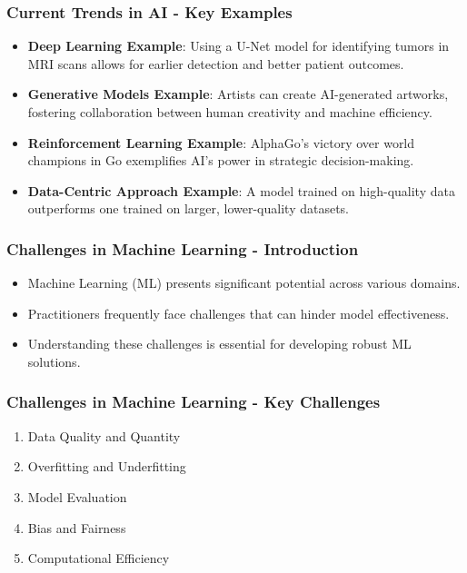 \documentclass[aspectratio=169]{beamer}
\begin{document}
\begin{frame}[fragile]
    \frametitle{Current Trends in AI - Key Examples}
    \begin{itemize}
        \item \textbf{Deep Learning Example}: 
        Using a U-Net model for identifying tumors in MRI scans allows for earlier detection and better patient outcomes.

        \item \textbf{Generative Models Example}:
        Artists can create AI-generated artworks, fostering collaboration between human creativity and machine efficiency.

        \item \textbf{Reinforcement Learning Example}:
        AlphaGo's victory over world champions in Go exemplifies AI’s power in strategic decision-making.

        \item \textbf{Data-Centric Approach Example}:
        A model trained on high-quality data outperforms one trained on larger, lower-quality datasets.
    \end{itemize}
\end{frame}

\begin{frame}[fragile]
    \frametitle{Challenges in Machine Learning - Introduction}
    \begin{itemize}
        \item Machine Learning (ML) presents significant potential across various domains.
        \item Practitioners frequently face challenges that can hinder model effectiveness.
        \item Understanding these challenges is essential for developing robust ML solutions.
    \end{itemize}
\end{frame}

\begin{frame}[fragile]
    \frametitle{Challenges in Machine Learning - Key Challenges}
    \begin{enumerate}
        \item Data Quality and Quantity
        \item Overfitting and Underfitting
        \item Model Evaluation
        \item Bias and Fairness
        \item Computational Efficiency
    \end{enumerate}
\end{frame}
\end{document}
